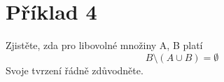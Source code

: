 \section*{Příklad 4}
Zjistěte, zda pro libovolné množiny A, B platí
$$ B \setminus \left(A \cup B \right) = \emptyset $$
Svoje tvrzení řádně zdůvodněte.
